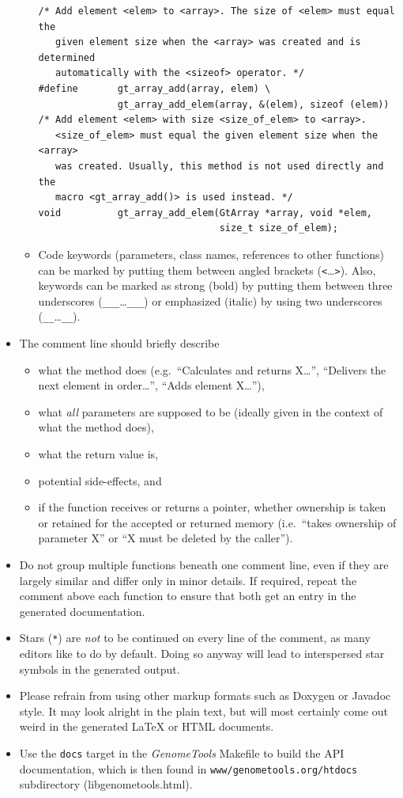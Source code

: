 \documentclass[11pt,final]{article}
\newcommand{\keyword}[1]{\lstinline{#1}}
\newcommand{\Gt}[0]{\emph{GenomeTools}\xspace}
\begin{document}
\begin{itemize}
\begin{itemize}
\begin{lstlisting}
/* Add element <elem> to <array>. The size of <elem> must equal the
   given element size when the <array> was created and is determined
   automatically with the <sizeof> operator. */
#define       gt_array_add(array, elem) \
              gt_array_add_elem(array, &(elem), sizeof (elem))
/* Add element <elem> with size <size_of_elem> to <array>.
   <size_of_elem> must equal the given element size when the <array>
   was created. Usually, this method is not used directly and the
   macro <gt_array_add()> is used instead. */
void          gt_array_add_elem(GtArray *array, void *elem,
                                size_t size_of_elem);
\end{lstlisting}
\item
Code keywords (parameters, class names, references to other functions) can be
marked by putting them between angled brackets (\keyword{<}\dots\keyword{>}).
Also, keywords can be marked as strong (bold) by putting them between
three underscores (\keyword{___}\dots\keyword{___}) or emphasized (italic) by
using two underscores (\keyword{__}\dots\keyword{__}).
\end{itemize}
\item
The comment line should briefly describe
\begin{itemize}
\item
what the method does (e.g.\ ``Calculates and returns X\dots'',
``Delivers the next element in order\dots'', ``Adds element X\dots''),
\item
what \emph{all} parameters are supposed to be (ideally given in the context of
what the method does),
\item
what the return value is,
\item
potential side-effects, and
\item
if the function receives or returns a pointer, whether ownership is taken or
retained for the accepted or returned memory (i.e.\ ``takes ownership of
parameter X'' or ``X must be deleted by the caller'').
\end{itemize}
\item
Do not group multiple functions beneath one comment line, even if they are
largely similar and differ only in minor details. If required, repeat the
comment above each function to ensure that both get an entry in the generated
documentation.
\item
Stars (\keyword{*}) are \emph{not} to be continued on every line of the comment,
as many editors like to do by default. Doing so anyway will lead to interspersed
star symbols in the generated output.
\item
Please refrain from using other markup formats such as Doxygen or Javadoc style.
It may look alright in the plain text, but will most certainly come out weird in
the generated LaTeX or HTML documents.
\item
Use the \keyword{docs} target in the \Gt Makefile to build the API
documentation, which is then found in \keyword{www/genometools.org/htdocs}
subdirectory (libgenometools.html).
\end{itemize}
\end{document}
